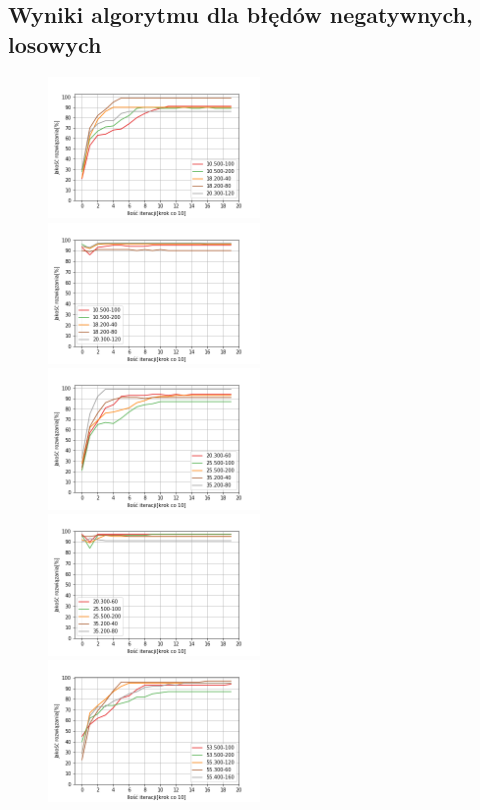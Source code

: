 \documentclass{article}
\begin{document}
\subsection{Wyniki algorytmu dla błędów negatywnych, losowych}
\begin{figure}[H]
\includegraphics[width=0.5\textwidth]{neg-los1.png}
\includegraphics[width=0.5\textwidth]{neg-los-greedy1.png}
\includegraphics[width=0.5\textwidth]{neg-los2.png}
\includegraphics[width=0.5\textwidth]{neg-los-greedy2.png}
\includegraphics[width=0.5\textwidth]{neg-los3.png}

\end{figure}
\end{document}
